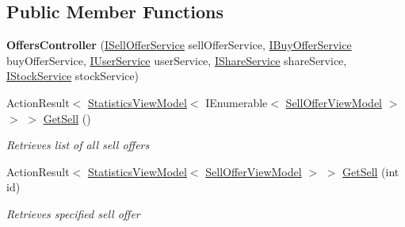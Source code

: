 \subsection*{Public Member Functions}
\begin{DoxyCompactItemize}
\item 
\mbox{\label{class_gielda_l2_1_1_a_p_i_1_1_controllers_1_1_offers_controller_aa1657f14eea038a7c00ef929d36cec68}} 
{\bfseries Offers\+Controller} (\mbox{\hyperlink{interface_gielda_l2_1_1_i_n_f_r_a_s_t_r_u_c_t_u_r_e_1_1_interfaces_1_1_i_sell_offer_service}{I\+Sell\+Offer\+Service}} sell\+Offer\+Service, \mbox{\hyperlink{interface_gielda_l2_1_1_i_n_f_r_a_s_t_r_u_c_t_u_r_e_1_1_interfaces_1_1_i_buy_offer_service}{I\+Buy\+Offer\+Service}} buy\+Offer\+Service, \mbox{\hyperlink{interface_gielda_l2_1_1_i_n_f_r_a_s_t_r_u_c_t_u_r_e_1_1_interfaces_1_1_i_user_service}{I\+User\+Service}} user\+Service, \mbox{\hyperlink{interface_gielda_l2_1_1_i_n_f_r_a_s_t_r_u_c_t_u_r_e_1_1_interfaces_1_1_i_share_service}{I\+Share\+Service}} share\+Service, \mbox{\hyperlink{interface_gielda_l2_1_1_i_n_f_r_a_s_t_r_u_c_t_u_r_e_1_1_interfaces_1_1_i_stock_service}{I\+Stock\+Service}} stock\+Service)
\item 
Action\+Result$<$ \mbox{\hyperlink{class_gielda_l2_1_1_a_p_i_1_1_view_models_1_1_view_1_1_statistics_view_model}{Statistics\+View\+Model}}$<$ I\+Enumerable$<$ \mbox{\hyperlink{class_gielda_l2_1_1_a_p_i_1_1_view_models_1_1_view_1_1_sell_offer_view_model}{Sell\+Offer\+View\+Model}} $>$ $>$ $>$ \mbox{\hyperlink{class_gielda_l2_1_1_a_p_i_1_1_controllers_1_1_offers_controller_a9ac2f421d868e7f0583c2b43368b5a28}{Get\+Sell}} ()
\begin{DoxyCompactList}\small\item\em Retrieves list of all sell offers \end{DoxyCompactList}\item 
Action\+Result$<$ \mbox{\hyperlink{class_gielda_l2_1_1_a_p_i_1_1_view_models_1_1_view_1_1_statistics_view_model}{Statistics\+View\+Model}}$<$ \mbox{\hyperlink{class_gielda_l2_1_1_a_p_i_1_1_view_models_1_1_view_1_1_sell_offer_view_model}{Sell\+Offer\+View\+Model}} $>$ $>$ \mbox{\hyperlink{class_gielda_l2_1_1_a_p_i_1_1_controllers_1_1_offers_controller_a64df0f58d04d15edaa4630627838644b}{Get\+Sell}} (int id)
\begin{DoxyCompactList}\small\item\em Retrieves specified sell offer \end{DoxyCompactList}\item 

\end{DoxyCompactItemize}
